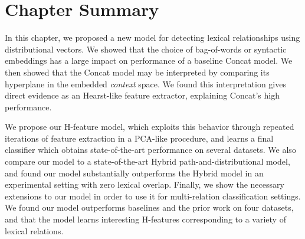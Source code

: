 \section{Chapter Summary}

In this chapter, we proposed a new model for detecting lexical relationships
using distributional vectors. We showed that the choice of bag-of-words
or syntactic embeddings has a large impact on performance of a baseline
Concat model. We then showed that the Concat model may be interpreted by
comparing its hyperplane in the embedded {\em context} space. We found
this interpretation gives direct evidence as an Hearst-like feature extractor,
explaining Concat's high performance.

We propose our H-feature
model, which exploits this behavior through repeated iterations of feature
extraction in a PCA-like procedure, and learns a final classifier which obtains
state-of-the-art performance on several datasets. We also compare our model
to a state-of-the-art Hybrid path-and-distributional model, and found our
model substantially outperforms the Hybrid model in an experimental setting
with zero lexical overlap. Finally, we show the necessary extensions to our
model in order to use it for multi-relation classification settings. We found
our model outperforms baselines and the prior work on four datasets, and that
the model learns interesting H-features corresponding to a variety of
lexical relations.

